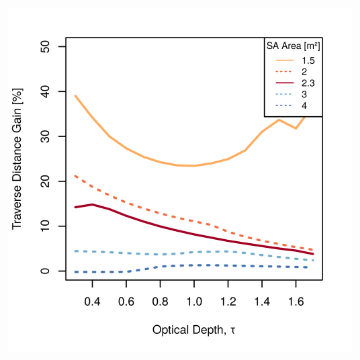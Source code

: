 \begin{figure}[h]
\captionsetup[subfigure]{justification=centering}
\vspace{-2ex}
	\centering
    \setlength{\subfigureWidth}{0.50\textwidth}
    \setlength{\graphicsHeight}{80mm}
    \hypersetup{hidelinks=true}%
    \begin{subfigure}[t]{\subfigureWidth}
        \centering
        \includegraphics[height=\graphicsHeight]{sections/design/solar-array/plots/ianichaos-75w-traverse-gains-for-different-solar-cell-coverage-areas.png}
		\label{fig:plot:sub:ismenius-chaos-flat-traverse-gains-for-different-sa-area}
    \end{subfigure}\hfill
    \begin{subfigure}[t]{\subfigureWidth}
        \centering

\end{subfigure}
\end{figure}
